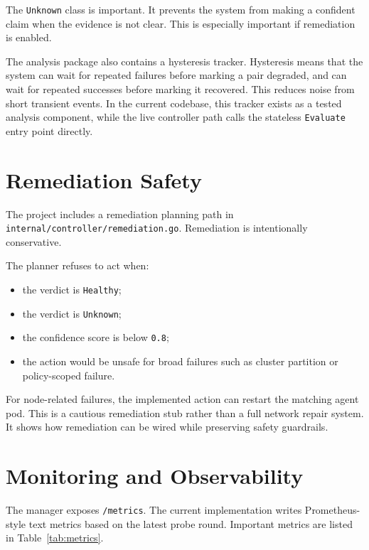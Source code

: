 \documentclass[11pt,a4paper]{article}
\newcommand{\code}[1]{\texttt{#1}}
\begin{document}
The \code{Unknown} class is important. It prevents the system from making a confident claim when the evidence is not clear. This is especially important if remediation is enabled.

The analysis package also contains a hysteresis tracker. Hysteresis means that the system can wait for repeated failures before marking a pair degraded, and can wait for repeated successes before marking it recovered. This reduces noise from short transient events. In the current codebase, this tracker exists as a tested analysis component, while the live controller path calls the stateless \code{Evaluate} entry point directly.

\section{Remediation Safety}

The project includes a remediation planning path in \code{internal/controller/remediation.go}. Remediation is intentionally conservative.

The planner refuses to act when:

\begin{itemize}
  \item the verdict is \code{Healthy};
  \item the verdict is \code{Unknown};
  \item the confidence score is below \code{0.8};
  \item the action would be unsafe for broad failures such as cluster partition or policy-scoped failure.
\end{itemize}

For node-related failures, the implemented action can restart the matching agent pod. This is a cautious remediation stub rather than a full network repair system. It shows how remediation can be wired while preserving safety guardrails.

\section{Monitoring and Observability}

The manager exposes \code{/metrics}. The current implementation writes Prometheus-style text metrics based on the latest probe round. Important metrics are listed in Table~\ref{tab:metrics}.
\end{document}
